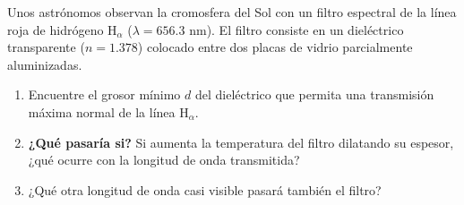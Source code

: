 \item Unos astrónomos observan la cromosfera del Sol con un filtro espectral de la línea roja de hidrógeno $\text{H}_\alpha$ ($\lambda = 656.3\text{ nm}$). El filtro consiste en un dieléctrico transparente ($n = 1.378$) colocado entre dos placas de vidrio parcialmente aluminizadas.
\begin{enumerate}
    \item Encuentre el grosor mínimo $d$ del dieléctrico que permita una transmisión máxima normal de la línea $\text{H}_\alpha$.
    \item \textbf{¿Qué pasaría si?} Si aumenta la temperatura del filtro dilatando su espesor, ¿qué ocurre con la longitud de onda transmitida?
    \item ¿Qué otra longitud de onda casi visible pasará también el filtro?
\end{enumerate}